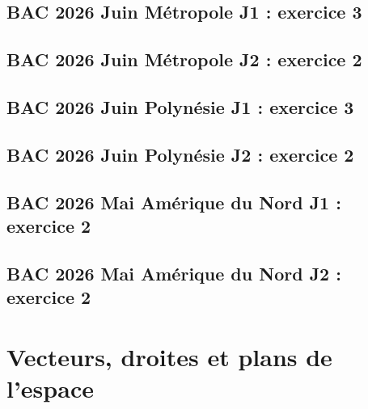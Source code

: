 \documentclass[lang=fr,edition=teacher,layout=sheet]{mxbook}
\begin{document}
\begingroup\endgroup
\par\bigskip
{}\subsection*{BAC 2026 Juin Métropole J1 : exercice 3}
\begingroup\endgroup
\par\bigskip
{}\subsection*{BAC 2026 Juin Métropole J2 : exercice 2}
\begingroup\endgroup
\par\bigskip
{}\subsection*{BAC 2026 Juin Polynésie J1 : exercice 3}
\begingroup\endgroup
\par\bigskip
{}\subsection*{BAC 2026 Juin Polynésie J2 : exercice 2}
\begingroup\endgroup
\par\bigskip
{}\subsection*{BAC 2026 Mai Amérique du Nord J1 : exercice 2}
\begingroup\endgroup
\par\bigskip
{}\subsection*{BAC 2026 Mai Amérique du Nord J2 : exercice 2}
\begingroup\endgroup
\par\bigskip
\clearpage\section*{Vecteurs, droites et plans de l'espace}
\end{document}
